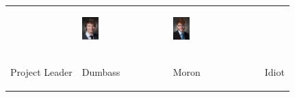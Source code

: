 \begin{table}
\begin{tabular}{p{}p{}p{}p{}}
&
\vspace{-1cm}\begin{center}\includegraphics[width=0.2\textwidth]{res/intro/Ich.png}\end{center}
&
\vspace{-1cm}\begin{center}\includegraphics[width=0.2\textwidth]{res/intro/Timo.png}\end{center}
\\
\vspace{-1cm}\begin{center}Project Leader\end{center} & 
\vspace{-1cm}\begin{center}Dumbass\end{center} & 
\vspace{-1cm}\begin{center}Moron\end{center} &
\vspace{-1cm}\begin{center}Idiot \end{center}
\end{tabular}
\end{table}